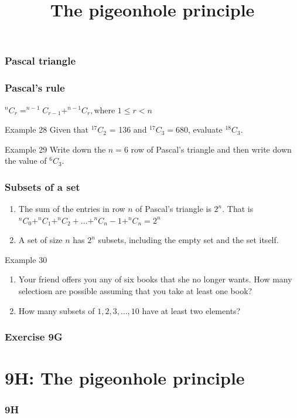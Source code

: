 \documentclass[
	11pt, %
]{beamer}
\begin{document}
\begin{frame}
    \frametitle{Pascal triangle}
\end{frame}

\begin{frame}
    \frametitle{Pascal's rule}
    $^nC_r = ^{n-1}C_{r-1} + ^{n-1}C_{r}, \text{where } 1\leq r<n$
    \begin{block}{Example 28}
        Given that $^{17}C_2$ = 136 and $^{17}C_3 = 680$, evaluate $^{18}C_3$.
    \end{block}
    \begin{block}{Example 29}
        Write down the $n=6$ row of Pascal's triangle and then write down the value of $^6C_3$.        
    \end{block}
\end{frame}

\begin{frame}[t]
    \frametitle{Subsets of a set}
    \begin{enumerate}
        \item The sum of the entries in row $n$ of Pascal's triangle is $2^n$. That is\\
        $^nC_0 + ^nC_1 + ^nC_2 + \dots + ^nC_n-1 + ^nC_n = 2^n$
        \item A set of size $n$ has $2^n$ subsets, including the empty set and the set itself.
    \end{enumerate}
    \begin{block}{Example 30}
        \begin{enumerate}
            \item Your friend offers you any of six books that she no longer wants. How many selectiosn are possible assuming that you take at least one book?
            \item How many subsets of ${1,2,3, \dots, 10}$ have at least two elements?
        \end{enumerate}
    \end{block}
\end{frame}

\begin{frame}
    \frametitle{Exercise 9G}
\end{frame}


\section{9H: The pigeonhole principle}
\begin{frame}
    \frametitle{9H}
    \begin{center}
        \title{The pigeonhole principle}
        \maketitle
    \end{center}
\end{frame}
\end{document}
